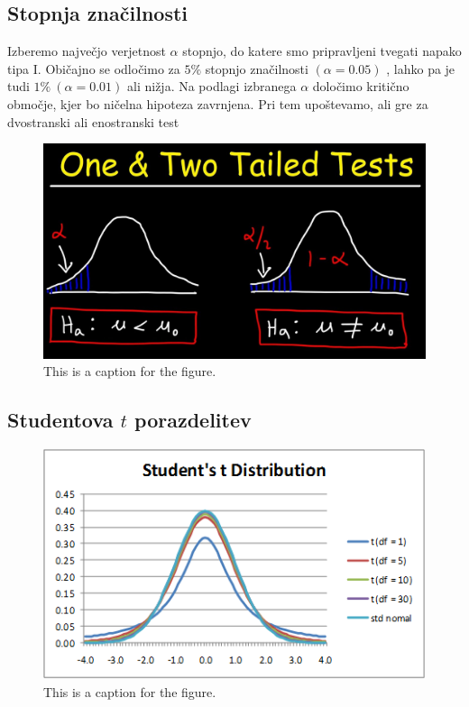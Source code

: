 \subsection*{Stopnja značilnosti}

Izberemo največjo verjetnost $\alpha$ stopnjo, do katere smo pripravljeni tvegati napako tipa I. Običajno se odločimo za $5\%$ stopnjo značilnosti $(\alpha = 0.05)$ , lahko pa je tudi $1\%\  (\alpha = 0.01)$ ali nižja. Na podlagi izbranega $\alpha$ določimo kritično območje, kjer bo ničelna hipoteza zavrnjena. Pri tem upoštevamo, ali gre za dvostranski ali enostranski test

\begin{figure}[h]
    \centering
    \includegraphics[width=\textwidth]{pictures/one_two_tail.jpg}
    \caption{This is a caption for the figure.}
    \label{fig:one_two_tail}
\end{figure}

\subsection*{Studentova $t$ porazdelitev}

\begin{figure}[h]
    \centering
    \includegraphics[width=\textwidth]{pictures/t_porazdelitev.png} %
    \caption{This is a caption for the figure.}
    \label{fig:t_porazdelitev}
\end{figure}

